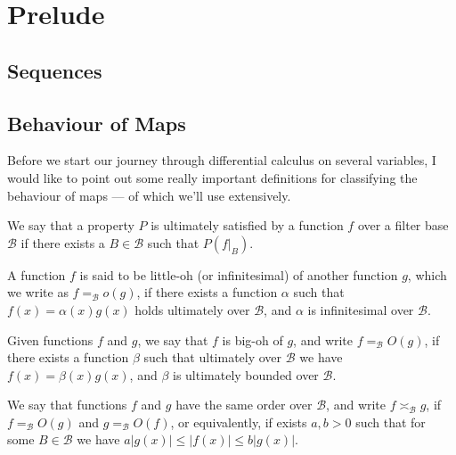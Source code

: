 \section{Prelude}

\subsection{Sequences}


\subsection{Behaviour of Maps}

Before we start our journey through differential calculus on several variables,
I would like to point out some really important definitions for classifying the
behaviour of maps --- of which we'll use extensively.

\begin{definition}[Ultimately]
We say that a property \(P\) is ultimately satisfied by a function \(f\) over
a filter base \(\mathcal B\) if there exists a \(B \in \mathcal B\) such that
\(P(f|_B)\).
\end{definition}

\begin{definition}[Little-oh]\label{def: little oh}
A function \(f\) is said to be little-oh (or infinitesimal) of another
function \(g\), which we write as \(f =_{\mathcal B} o(g)\), if there exists
a function \(\alpha\) such that \(f(x) = \alpha(x) g(x)\) holds ultimately
over \(\mathcal B\), and \(\alpha\) is infinitesimal over \(\mathcal B\).
\end{definition}

\begin{definition}[Big-oh]\label{def: big oh}
Given functions \(f\) and \(g\), we say that \(f\) is big-oh of \(g\), and
write \(f =_{\mathcal B} O(g)\), if there exists a function \(\beta\) such
that ultimately over \(\mathcal B\) we have \(f(x) = \beta(x) g(x)\), and
\(\beta\) is ultimately bounded over \(\mathcal B\).
\end{definition}

\begin{definition}\label{def: asymp-order}
We say that functions \(f\) and \(g\) have the same order over \(\mathcal
B\), and write \(f \asymp_{\mathcal B} g\), if \(f =_{\mathcal B} O(g)\) and
\(g =_{\mathcal B} O(f)\), or equivalently, if exists \(a, b > 0\) such that
for some \(B \in \mathcal B\) we have \(a |g(x)| \leq |f(x)| \leq b|g(x)|\).
\end{definition}

